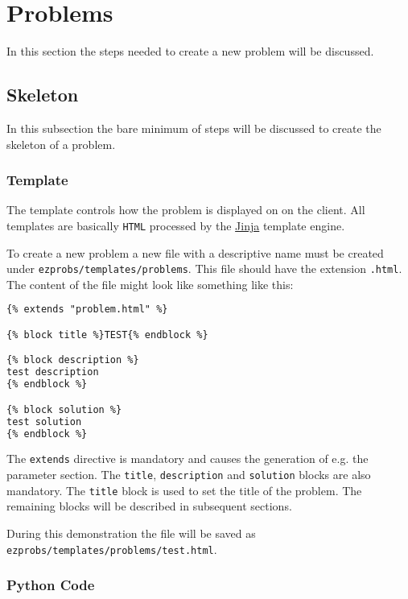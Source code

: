 \section{Problems}

In this section the steps needed to create a new problem will be discussed.

\subsection{Skeleton}

In this subsection the bare minimum of steps will be discussed to create the
skeleton of a problem.

\subsubsection{Template}

The template controls how the problem is displayed on on the client. All
templates are basically \verb+HTML+ processed by the
\href{https://jinja.palletsprojects.com/}{Jinja} template engine.

To create a new problem a new file with a descriptive name must be created
under \verb+ezprobs/templates/problems+. This file should have the extension
\verb+.html+. The content of the file might look like something like this:

\begin{lstlisting}[language=html]
{% extends "problem.html" %}

{% block title %}TEST{% endblock %}

{% block description %}
test description
{% endblock %}

{% block solution %}
test solution
{% endblock %}
\end{lstlisting}

The \verb+extends+ directive is mandatory and causes the generation of e.g. the
parameter section.  The \verb+title+, \verb+description+ and \verb+solution+
blocks are also mandatory. The \verb+title+ block is used to set the title of
the problem. The remaining blocks will be described in subsequent sections.

During this demonstration the file will be saved as \verb+ezprobs/templates/problems/test.html+.

\subsubsection{Python Code}

